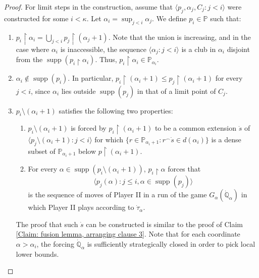 \documentclass[10pt,a4paper]{amsart}
\newcommand{\la}{\langle}
\newcommand{\po}{\mathbb{P}}
\newcommand{\qo}{\mathbb{Q}}
\newcommand{\ra}{\rangle}
\renewcommand{\restriction}{\mathbin\upharpoonright}    %
\DeclareMathOperator{\supp}{supp}
\begin{document}
\begin{proof}
    For limit steps in the construction, assume that $\la p_j, \alpha_j , C_j \colon j<i \ra$ were constructed for some $i<\kappa$. Let $\alpha_i = \sup_{j<i}\alpha_j$. We define $p_i \in \po$ such that:
    \begin{enumerate}
     \item $p_i\restriction \alpha_{i} = \bigcup_{j<i} p_j \restriction (\alpha_j+1)$. Note that the union is increasing, and in the case where $\alpha_i$ is inaccessible, the sequence $\la \alpha_j \colon j<i \ra$ is a club in $\alpha_i$ disjoint from the $\supp(p_i\restriction \alpha_i)$. Thus,  $p_i\restriction \alpha_i\in \po_{\alpha_i}$.
        \item $\alpha_i \notin \supp(p_i)$. In particular, $p_i\restriction (\alpha_i+1 )\leq p_j \restriction (\alpha_i+1)$ for every $j<i$, since $\alpha_i$ lies outside $\supp(p_j)$  in that of a  limit point of $C_j$.
        \item $p_{i}\setminus (\alpha_{i}+1)$ satisfies the following two properties:
        \begin{enumerate}
            \item $p_i\setminus (\alpha_i+1)$ is forced by $p_i\restriction (\alpha_i+1)$ to be a common extension $\dot{s}$ of $\la p_j \setminus (\alpha_i+1) \colon j<i \ra$ for which $\{  r\in \po_{\alpha_i+1} \colon r^{\frown} \dot{s} \in d(\alpha_i) \}$ is a dense subset of $\po_{\alpha_i+1}$ below $p\restriction (\alpha_{i}+1)$.
            \item For every $\alpha\in \supp(p_{i}\setminus (\alpha_{i}+1))$, $p_{i}\restriction \alpha$ forces that $$\la p_j(\alpha) \colon j\leq i, \alpha\in \supp(p_j) \ra$$ is the sequence of moves of Player II in a run of the game $G_\alpha(\dot{\qo}_\alpha)$ in which Player II plays according to $\dot{\tau}_\alpha$.
        \end{enumerate}
        The proof that such $\dot{s}$ can be constructed is similar to the proof of Claim \ref{Claim: fusion lemma, arranging clause 3}. Note that for each coordinate $\alpha > \alpha_i$, the forcing $\dot{\qo}_\alpha$ is sufficiently strategically closed in order to pick local lower bounds.
    \end{enumerate}


\end{proof}
\end{document}
